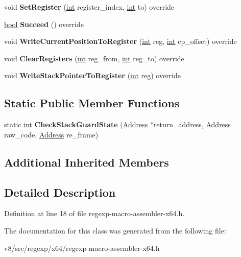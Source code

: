 \begin{DoxyCompactItemize}
void {\bfseries Set\+Register} (\mbox{\hyperlink{classint}{int}} register\+\_\+index, \mbox{\hyperlink{classint}{int}} to) override
\item 
\mbox{\label{classv8_1_1internal_1_1RegExpMacroAssemblerX64_a1334702be8373fc646cbdbcea1c63805}} 
\mbox{\hyperlink{classbool}{bool}} {\bfseries Succeed} () override
\item 
\mbox{\label{classv8_1_1internal_1_1RegExpMacroAssemblerX64_af5887b284cec9a36eb724a1984b1e1f2}} 
void {\bfseries Write\+Current\+Position\+To\+Register} (\mbox{\hyperlink{classint}{int}} reg, \mbox{\hyperlink{classint}{int}} cp\+\_\+offset) override
\item 
\mbox{\label{classv8_1_1internal_1_1RegExpMacroAssemblerX64_a93affe4c7051effa7d728a6fda65f66e}} 
void {\bfseries Clear\+Registers} (\mbox{\hyperlink{classint}{int}} reg\+\_\+from, \mbox{\hyperlink{classint}{int}} reg\+\_\+to) override
\item 
\mbox{\label{classv8_1_1internal_1_1RegExpMacroAssemblerX64_ab1a9e3e57031d9446ff2fc2805802e74}} 
void {\bfseries Write\+Stack\+Pointer\+To\+Register} (\mbox{\hyperlink{classint}{int}} reg) override
\end{DoxyCompactItemize}
\subsection*{Static Public Member Functions}
\begin{DoxyCompactItemize}
\item 
\mbox{\label{classv8_1_1internal_1_1RegExpMacroAssemblerX64_a307ddc09da265890bb1ab28fd34d5388}} 
static \mbox{\hyperlink{classint}{int}} {\bfseries Check\+Stack\+Guard\+State} (\mbox{\hyperlink{classuintptr__t}{Address}} $\ast$return\+\_\+address, \mbox{\hyperlink{classuintptr__t}{Address}} raw\+\_\+code, \mbox{\hyperlink{classuintptr__t}{Address}} re\+\_\+frame)
\end{DoxyCompactItemize}
\subsection*{Additional Inherited Members}


\subsection{Detailed Description}


Definition at line 18 of file regexp-\/macro-\/assembler-\/x64.\+h.



The documentation for this class was generated from the following file\+:\begin{DoxyCompactItemize}
\item 
v8/src/regexp/x64/regexp-\/macro-\/assembler-\/x64.\+h\end{DoxyCompactItemize}
